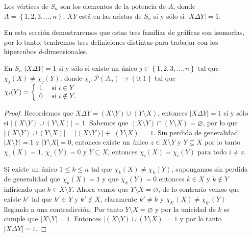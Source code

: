 \begin{definicion}
    Los v\'ertices de $S_n$ son los elementos de la potencia de $A$, donde $A=\left\{1,2,3, \dots, n\right\}$; $XY$
    est\'a en las aristas de $S_n$ si y s\'olo si $|X \Delta Y|=1$.
\end{definicion}

En esta secci\'on demostraremos que estas tres familias de gr\'aficas son isomorfas, por lo tanto, tendremos tres
definiciones distintas para trabajar con los hipercubos $d$-dimensionales.


\begin{lema}
    \label{lemcub}
    En $S_n$ $|X \Delta Y|=1$ si y s\'olo si existe un \'unico $j \in \left\{1,2,3, \dots, n\right\}$ tal que $\chi_j
    (X) \ne \chi_j(Y)$, donde $\chi_i: \mathcal{P}(A_n) \to \left\{0,1\right\}$ tal que  $\chi_i(Y) = \left\{
    \begin{array}{cl}
        1 & \textnormal{ si } i \in Y \\ 0 & \textnormal{ si } i \notin Y.
    \end{array} \right.$
\end{lema}

\begin{proof}
    Recordemos que $X \Delta Y=(X \setminus Y) \cup (Y \setminus X)$, entonces $|X \Delta Y|=1$ si y s\'olo si $|(X
    \setminus Y) \cup (Y \setminus X)|=1$. Sabemos que $(X \setminus Y) \cap (Y \setminus X)= \varnothing$, por lo
    que $|(X \setminus Y) \cup (Y \setminus X)|=|(X \setminus Y)| + |(Y \setminus X)|=1$.
    Sin perdida de generalidad $|X \setminus Y|=1$ y $|Y \setminus X|=0$, entonces existe un \'unico $z \in X
    \setminus Y$ y $Y\subseteq X$ por lo tanto $\chi_z(X)=1$, $\chi_z(Y)=0$ y $Y \subseteq X$, entonces $\chi_i(X)
    =\chi_i(Y)$ para todo $i \ne z$.

    Si existe un \'unico $1 \le k \le n$ tal que $\chi_k(X) \ne \chi_k(Y)$, supongamos sin perdida de generalidad que
    $\chi_k(X)=1$ y que $\chi_k(Y)=0$ entonces $k \in X$ y $k \notin Y$ infiriendo que $k \in X \setminus Y$. Ahora
    vemos que $Y \setminus X= \varnothing$, de lo contrario vemos que existe $k'$ tal que $k' \in Y$ y $k' \notin X$,
    claramente $k' \ne k$ y $\chi_{k'}(X) \ne \chi_{k'}(Y)$ llegando a una contradicci\'on. Por tanto $Y \setminus
    X=\varnothing$ y por la unicidad de $k$ se cumple que $|X \setminus Y|=1$. Entonces $|(X \setminus Y) \cup (Y
    \setminus X)|=1$ y por lo tanto $|X \Delta Y|=1$.
\end{proof}

